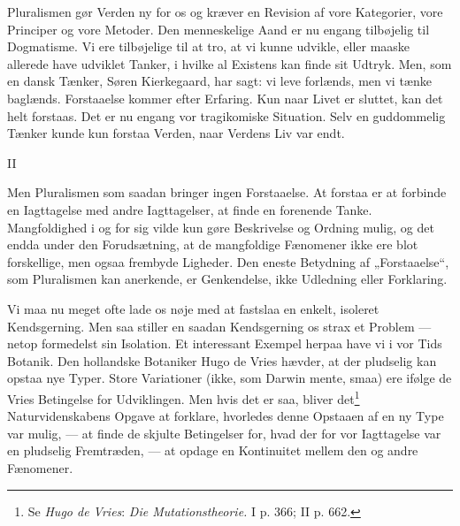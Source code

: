 \documentclass[12pt,a4paper,openany]{book}
\newcommand{\opage}[1]{\marginnote{\footnotesize\textit{[#1]}}}
\begin{document}
Pluralismen gør Verden ny for os og kræver en Revision
af vore Kategorier, vore Principer og vore Metoder. Den menneskelige
Aand er nu engang tilbøjelig til Dogmatisme. Vi ere
tilbøjelige til at tro, at vi kunne udvikle, eller maaske allerede
have udviklet Tanker, i hvilke al Existens kan finde sit Udtryk.
Men, som en dansk Tænker, Søren Kierkegaard, har sagt: vi
leve forlænds, men vi tænke baglænds. Forstaaelse kommer
efter Erfaring. Kun naar Livet er sluttet, kan det helt forstaas.
Det er nu engang vor tragikomiske Situation. Selv en guddommelig
Tænker kunde kun forstaa Verden, naar Verdens Liv
var endt.

\begin{center}II\end{center}


Men Pluralismen som saadan bringer ingen Forstaaelse. At
forstaa er at forbinde en Iagttagelse med andre Iagttagelser, at
finde en forenende Tanke. Mangfoldighed i og for sig  vilde kun
\setcounter{footnote}{0}%
\opage{20}gøre Beskrivelse og Ordning mulig, og det endda under den
Forudsætning, at de mangfoldige Fænomener ikke ere blot forskellige,
men ogsaa frembyde Ligheder. Den eneste Betydning
af „Forstaaelse“, som Pluralismen kan anerkende, er Genkendelse,
ikke Udledning eller Forklaring.

Vi maa nu meget ofte lade os nøje med at fastslaa en
enkelt, isoleret Kendsgerning. Men saa stiller en saadan Kendsgerning
os strax et Problem --- netop formedelst sin Isolation.
Et interessant Exempel herpaa have vi i vor Tids Botanik. Den
hollandske Botaniker Hugo de Vries hævder, at der pludselig
kan opstaa nye Typer. Store Variationer (ikke, som Darwin
mente, smaa) ere ifølge de Vries Betingelse for Udviklingen.
Men hvis det er saa, bliver det\footnote[1]{Se \emph{Hugo de Vries}: \textit{Die Mutationstheorie.} I p. 366; II p. 662.} Naturvidenskabens Opgave at
forklare, hvorledes denne Opstaaen af en ny Type var mulig,
--- at finde de skjulte Betingelser for, hvad der for vor Iagttagelse
var en pludselig Fremtræden, --- at opdage en Kontinuitet
mellem den og andre Fænomener.
\end{document}
